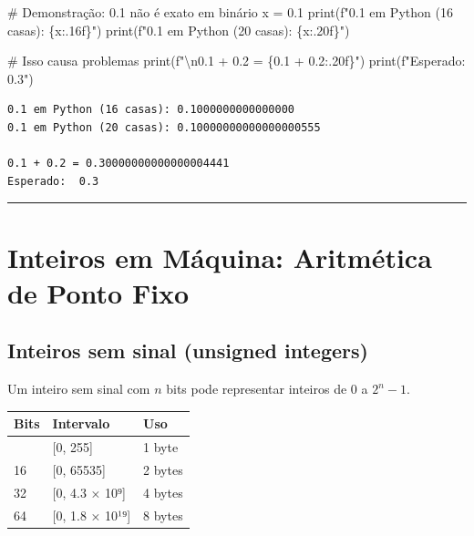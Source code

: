 \documentclass[
  11pt,
  letterpaper,
  DIV=11,
  numbers=noendperiod]{scrartcl}
\newenvironment{Shaded}{\begin{snugshade}}{\end{snugshade}}
\newcommand{\BuiltInTok}[1]{\textcolor[rgb]{0.00,0.23,0.31}{#1}}
\newcommand{\CharTok}[1]{\textcolor[rgb]{0.13,0.47,0.30}{#1}}
\newcommand{\CommentTok}[1]{\textcolor[rgb]{0.37,0.37,0.37}{#1}}
\newcommand{\FloatTok}[1]{\textcolor[rgb]{0.68,0.00,0.00}{#1}}
\newcommand{\NormalTok}[1]{\textcolor[rgb]{0.00,0.23,0.31}{#1}}
\newcommand{\OperatorTok}[1]{\textcolor[rgb]{0.37,0.37,0.37}{#1}}
\newcommand{\SpecialCharTok}[1]{\textcolor[rgb]{0.37,0.37,0.37}{#1}}
\newcommand{\SpecialStringTok}[1]{\textcolor[rgb]{0.13,0.47,0.30}{#1}}
\newcounter{none} %
\begin{document}
\begin{Shaded}
\begin{Highlighting}[]
\CommentTok{\# Demonstração: 0.1 não é exato em binário}
\NormalTok{x }\OperatorTok{=} \FloatTok{0.1}
\BuiltInTok{print}\NormalTok{(}\SpecialStringTok{f"0.1 em Python (16 casas): }\SpecialCharTok{\{}\NormalTok{x}\SpecialCharTok{:.16f\}}\SpecialStringTok{"}\NormalTok{)}
\BuiltInTok{print}\NormalTok{(}\SpecialStringTok{f"0.1 em Python (20 casas): }\SpecialCharTok{\{}\NormalTok{x}\SpecialCharTok{:.20f\}}\SpecialStringTok{"}\NormalTok{)}

\CommentTok{\# Isso causa problemas}
\BuiltInTok{print}\NormalTok{(}\SpecialStringTok{f"}\CharTok{\textbackslash{}n}\SpecialStringTok{0.1 + 0.2 = }\SpecialCharTok{\{}\FloatTok{0.1} \OperatorTok{+} \FloatTok{0.2}\SpecialCharTok{:.20f\}}\SpecialStringTok{"}\NormalTok{)}
\BuiltInTok{print}\NormalTok{(}\SpecialStringTok{f"Esperado:  0.3"}\NormalTok{)}
\end{Highlighting}
\end{Shaded}

\begin{verbatim}
0.1 em Python (16 casas): 0.1000000000000000
0.1 em Python (20 casas): 0.10000000000000000555

0.1 + 0.2 = 0.30000000000000004441
Esperado:  0.3
\end{verbatim}

\begin{center}\rule{0.5\linewidth}{0.5pt}\end{center}

\section{Inteiros em Máquina: Aritmética de Ponto
Fixo}\label{inteiros-em-muxe1quina-aritmuxe9tica-de-ponto-fixo}

\subsection{Inteiros sem sinal (unsigned
integers)}\label{inteiros-sem-sinal-unsigned-integers}

Um inteiro sem sinal com \(n\) bits pode representar inteiros de \(0\) a
\(2^n - 1\).

{\def\LTcaptype{none} %
\begin{longtable}[]{@{}lll@{}}
\toprule\noalign{}
Bits & Intervalo & Uso \\
\midrule\noalign{}
\endhead
\bottomrule\noalign{}
\endlastfoot
8 & {[}0, 255{]} & 1 byte \\
16 & {[}0, 65535{]} & 2 bytes \\
32 & {[}0, 4.3 × 10⁹{]} & 4 bytes \\
64 & {[}0, 1.8 × 10¹⁹{]} & 8 bytes \\
\end{longtable}
}
\end{document}
